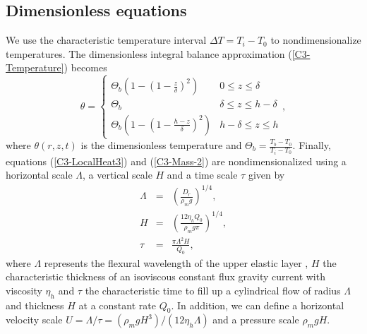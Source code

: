 \subsection{Dimensionless equations}
\label{C3-sec:dimens-equat}

We use the characteristic temperature interval $\Delta T = T_i-T_0$ to
nondimensionalize  temperatures.  The  dimensionless integral  balance
approximation (\ref{C3-Temperature}) becomes
\begin{equation}
  \theta=
  \begin{cases}
    \Theta_b\left(1 -(1-\frac{z}{\delta})^2\right)& 0 \le z\le \delta \\
    \Theta_b & \delta \le z\le h-\delta \\
    \Theta_b\left(1-(1-\frac{h-z}{\delta})^2\right)  &   h-\delta  \le
    z\le h
  \end{cases},
  \label{C3-Temperature2}
\end{equation}
where   $\theta(r,z,t)$   is   the   dimensionless   temperature   and
$\Theta_b=\frac{T_b-T_0}{T_{i}-T_0}$.         Finally,       equations
(\ref{C3-LocalHeat3})  and  (\ref{C3-Mass-2})  are  nondimensionalized
using a  horizontal scale $\Lambda$, a  vertical scale $H$ and  a time
scale $\tau$ given by
\begin{eqnarray}
  \Lambda &=& \left(\frac{D_r}{\rho_m g}\right)^{1/4}\label{C3-L1},\\
  H&=&\left       (\frac{12\eta_h      Q_{0}}{\rho_{m}g       \pi}\right      )
       ^{1/4} \label{C3-H1},\\
  \tau&=&\frac{\pi \Lambda^{2} H}{Q_{0}}\label{C3-T1},
\end{eqnarray}
where  $\Lambda$  represents  the  flexural wavelength  of  the  upper
elastic layer \citep{Michaut:2011kg}, $H$ the characteristic thickness
of an isoviscous constant flux gravity current with viscosity $\eta_h$
\citep{Huppert:1982wr} and $\tau$ the characteristic time to fill up a
cylindrical flow of  radius $\Lambda$ and thickness $H$  at a constant
rate $Q_0$.   In addition, we  can define a horizontal  velocity scale
$U=\Lambda/\tau=\left(\rho_m           g           H^3\right)/\left(12
  \eta_h\Lambda\right)$ and a pressure scale $\rho_m g H$.

